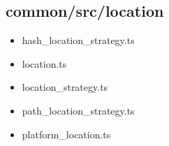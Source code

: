 \subsection{common/src/location}


\begin{itemize}
  \item hash\_location\_strategy.ts
  \item location.ts
  \item location\_strategy.ts
  \item path\_location\_strategy.ts
  \item platform\_location.ts
\end{itemize}























